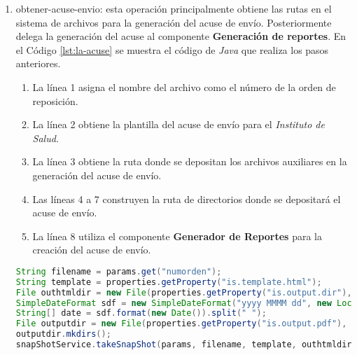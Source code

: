 \begin{enumerate}
	\item obtener-acuse-envio: esta operación principalmente obtiene las rutas en el sistema de archivos para la generación del acuse de envío. Posteriormente delega la generación del acuse al componente \textbf{Generación de reportes}. En el Código \ref{lst:la-acuse} se muestra el código de \textit{Java} que realiza los pasos anteriores.
	\begin{enumerate}
		\item La línea 1 asigna el nombre del archivo como el número de la orden de reposición.
		\item La línea 2 obtiene la plantilla del acuse de envío para el \textit{Instituto de Salud}.
		\item La línea 3 obtiene la ruta donde se depositan los archivos auxiliares en la generación del acuse de envío.
		\item Las líneas 4 a 7 construyen la ruta de directorios donde se depositará el acuse de envío.
		\item La línea 8 utiliza el componente \textbf{Generador de Reportes} para la creación del acuse de envío.
	\end{enumerate}
	\begin{lstlisting}[language=Java, caption={Generación del acuse de envío.}, captionpos=b, label={lst:la-acuse}]
String filename = params.get("numorden");
String template = properties.getProperty("is.template.html");
File outhtmldir = new File(properties.getProperty("is.output.dir"), filename + ".html");
SimpleDateFormat sdf = new SimpleDateFormat("yyyy MMMM dd", new Locale("es", "MX"));
String[] date = sdf.format(new Date()).split(" ");
File outputdir = new File(properties.getProperty("is.output.pdf"), String.format(REPORT_DIR_TMPL, date[0], date[1], date[2]));
outputdir.mkdirs();
snapShotService.takeSnapShot(params, filename, template, outhtmldir, outputdir);
	\end{lstlisting}
\end{enumerate}

